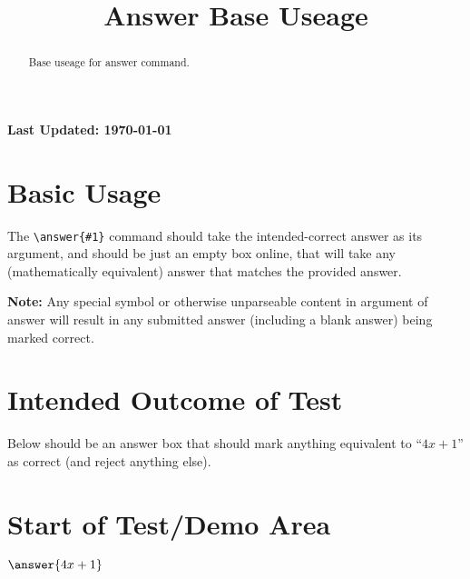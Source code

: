 \documentclass{ximera}
\title{Answer Base Useage}
\begin{document}
\begin{abstract}
    Base useage for answer command.
\end{abstract}
\maketitle

{{\Huge \bfseries Last Updated: \today}} \\


\section{Basic Usage}
The \verb|\answer{#1}| command should take the intended-correct answer as its argument, and should be just an empty box online, 
that will take any (mathematically equivalent) answer that matches the provided answer.

\textbf{Note:} Any special symbol or otherwise unparseable content in argument of answer will result in any submitted answer 
(including a blank answer) being marked correct.

\section{Intended Outcome of Test}
Below should be an answer box that should mark anything equivalent to ``$4x + 1$'' as correct (and reject anything else). 

\section{Start of Test/Demo Area}

\begin{problem}

    $\answer{4x + 1}$

\end{problem}

\hrulefill
\end{document}
